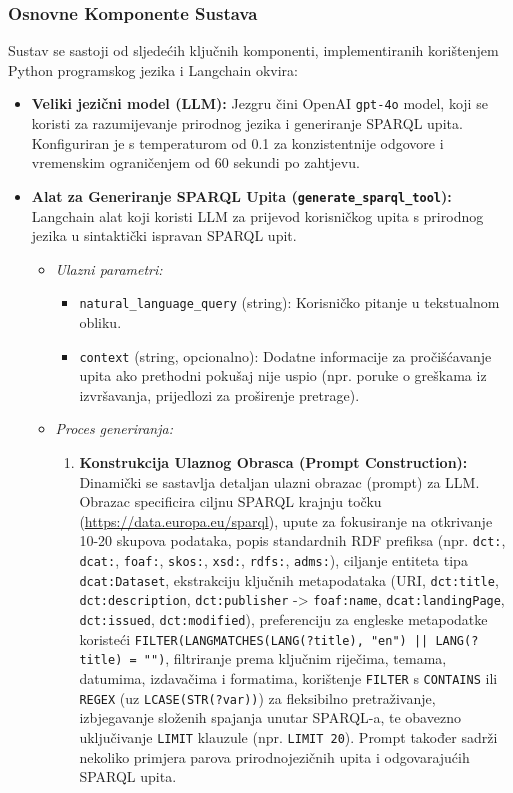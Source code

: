 \subsubsection{Osnovne Komponente Sustava}
\label{sec:llm_agent_components_sparql}
Sustav se sastoji od sljedećih ključnih komponenti, implementiranih korištenjem Python programskog jezika i Langchain okvira:

\begin{itemize}
    \item \textbf{Veliki jezični model (LLM):} Jezgru čini OpenAI \texttt{gpt-4o} model, koji se koristi za razumijevanje prirodnog jezika i generiranje SPARQL upita. Konfiguriran je s temperaturom od 0.1 za konzistentnije odgovore i vremenskim ograničenjem od 60 sekundi po zahtjevu.

    \item \textbf{Alat za Generiranje SPARQL Upita (\texttt{generate\_sparql\_tool}):} Langchain alat koji koristi LLM za prijevod korisničkog upita s prirodnog jezika u sintaktički ispravan SPARQL upit.
    \begin{itemize}
        \item \textit{Ulazni parametri:}
        \begin{itemize}
            \item \texttt{natural\_language\_query} (string): Korisničko pitanje u tekstualnom obliku.
            \item \texttt{context} (string, opcionalno): Dodatne informacije za pročišćavanje upita ako prethodni pokušaj nije uspio (npr. poruke o greškama iz izvršavanja, prijedlozi za proširenje pretrage).
        \end{itemize}
        \item \textit{Proces generiranja:}
        \begin{enumerate}
            \item \textbf{Konstrukcija Ulaznog Obrasca (Prompt Construction):} Dinamički se sastavlja detaljan ulazni obrazac (prompt) za LLM. Obrazac specificira ciljnu SPARQL krajnju točku (\url{https://data.europa.eu/sparql}), upute za fokusiranje na otkrivanje 10-20 skupova podataka, popis standardnih RDF prefiksa (npr. \texttt{dct:}, \texttt{dcat:}, \texttt{foaf:}, \texttt{skos:}, \texttt{xsd:}, \texttt{rdfs:}, \texttt{adms:}), ciljanje entiteta tipa \texttt{dcat:Dataset}, ekstrakciju ključnih metapodataka (URI, \texttt{dct:title}, \texttt{dct:description}, \texttt{dct:publisher} -> \texttt{foaf:name}, \texttt{dcat:landingPage}, \texttt{dct:issued}, \texttt{dct:modified}), preferenciju za engleske metapodatke koristeći \texttt{FILTER(LANGMATCHES(LANG(?title), "en") || LANG(?title) = "")}, filtriranje prema ključnim riječima, temama, datumima, izdavačima i formatima, korištenje \texttt{FILTER} s \texttt{CONTAINS} ili \texttt{REGEX} (uz \texttt{LCASE(STR(?var))}) za fleksibilno pretraživanje, izbjegavanje složenih spajanja unutar SPARQL-a, te obavezno uključivanje \texttt{LIMIT} klauzule (npr. \texttt{LIMIT 20}). Prompt također sadrži nekoliko primjera parova prirodnojezičnih upita i odgovarajućih SPARQL upita.

\end{enumerate}
\end{itemize}
\end{itemize}
